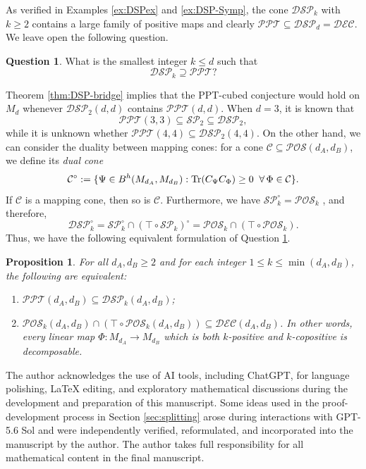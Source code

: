 \documentclass[11pt,reqno]{amsart}
\newtheorem{proposition}[theorem]{Proposition}
\theoremstyle{definition}
\theoremstyle{definition}
\theoremstyle{definition}
\theoremstyle{definition}
\newtheorem{question}
[theorem]{Question}
\newcommand{\PO}{\mathcal{POS}}
\newcommand{\SP}{\mathcal{SP}}
\newcommand{\DSP}{\mathcal{DSP}}
\newcommand{\PPT}{\mathcal{PPT}}
\newcommand{\DEC}{\mathcal{DEC}}
\begin{document}
As verified in Examples \ref{ex:DSPex} and \ref{ex:DSP-Symp}, the cone $\DSP_k$ with $k\geq 2$ contains a large family of positive maps and clearly $\PPT\subseteq \DSP_d= \DEC$. We leave open the following question.

\begin{question} \label{ques:DSP_PPT}
What is the smallest integer $k\leq d$ such that
    $$\DSP_k\supseteq \PPT?$$
\end{question}

Theorem \ref{thm:DSP-bridge} implies that the PPT-cubed conjecture would hold on $M_d$ whenever $\DSP_2(d,d)$ contains $\PPT(d,d)$. When $d=3$, it is known that \cite{YLT16} 
    $$\PPT(3,3)\subseteq  \SP_2\subseteq \DSP_2,$$
while it is unknown whether $\PPT(4,4)\subseteq\DSP_2(4,4)$. On the other hand, we can consider the duality between mapping cones: for a cone $\mathcal{C}\subseteq \PO(d_A,d_B)$, we define its \emph{dual cone}
    $$\mathcal{C}^{\circ}:=\{\Psi\in B^h(M_{d_A},M_{d_B}): \Tr(C_{\Psi}C_{\Phi})\geq 0\;\;\forall\,\Phi\in \mathcal{C}\}.$$
If $\mathcal{C}$ is a mapping cone, then so is $\mathcal{C}$. Furthermore, we have $\SP_k^{\circ} = \PO_k$ \cite{TH00,SSZ09}, and therefore,
    $$\DSP_k^{\circ} = \SP_k^{\circ} \cap (\top\circ \SP_k)^{\circ}  = \PO_k\cap (\top \circ \PO_k).$$
Thus, we have the following equivalent formulation of Question \ref{ques:DSP_PPT}.

\begin{proposition} \label{prop:DSP_PPT_equiv}
For all $d_A,d_B\geq 2$ and for each integer $1\leq k\leq \min(d_A,d_B)$, the following are equivalent:
\begin{enumerate}
    \item $\PPT(d_A,d_B)\subseteq \DSP_k(d_A,d_B)$;

    \item $\PO_k(d_A,d_B)\cap (\top\circ \PO_k(d_A,d_B))\subseteq \DEC(d_A,d_B)$. In other words, every linear map $\Phi:M_{d_A}\to M_{d_B}$ which is both $k$-positive and $k$-copositive is decomposable. 
\end{enumerate}
\end{proposition}

 The author acknowledges the use of AI tools, including ChatGPT, for language polishing, LaTeX editing, and exploratory mathematical discussions during the development and preparation of this manuscript. Some ideas used in the proof-development process in Section \ref{sec:splitting} arose during interactions with GPT-5.6 Sol and were independently verified, reformulated, and incorporated into the manuscript by the author. The author takes full responsibility for all mathematical content in the final manuscript.
\end{document}

